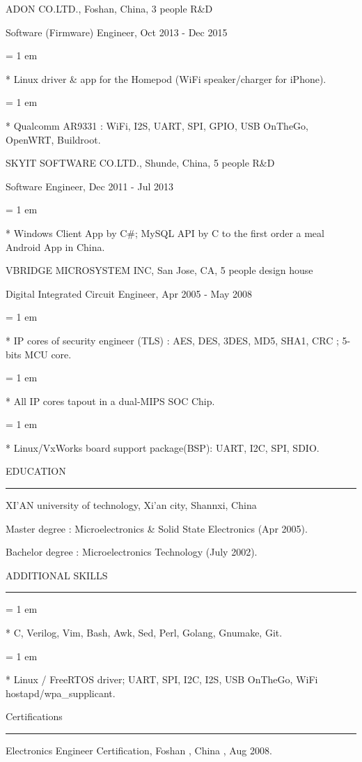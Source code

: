 { \medbreak } { \FFbg
ADON CO.LTD., Foshan, China, 3 people R\&D
}

{ \FFte
Software (Firmware) Engineer, Oct 2013 - Dec 2015
}
{ \parindent = 1 em \item{*}
 Linux driver \& app for the Homepod (WiFi speaker/charger for iPhone). 
}
{ \parindent = 1 em \item{*}
 Qualcomm AR9331 : WiFi, I2S, UART, SPI, GPIO, USB OnTheGo, OpenWRT, Buildroot.
 }

{ \medbreak } { \FFbg
SKYIT SOFTWARE CO.LTD., Shunde, China, 5 people R\&D
}

{ \FFte
Software Engineer, Dec 2011 - Jul 2013
}
{ \parindent = 1 em \item{*}
 Windows Client App by C\#; MySQL API by C to the first order a meal Android App in China.
 }

{ \medbreak } { \FFbg
VBRIDGE MICROSYSTEM INC, San Jose, CA, 5 people design house
}

{ \FFte
Digital Integrated Circuit Engineer, Apr 2005 - May 2008
}
{ \parindent = 1 em \item{*}
 IP cores of security engineer (TLS) :
 AES, DES, 3DES, MD5, SHA1, CRC ;
 5-bits MCU core.
 }
{ \parindent = 1 em \item{*}
All IP cores tapout in a dual-MIPS SOC Chip.
 }
{ \parindent = 1 em \item{*}
Linux/VxWorks board support package(BSP): UART, I2C, SPI, SDIO.
 }

{ \medbreak } { \FFbg
EDUCATION
}
{ \smallbreak } {\par\noindent\hrule} { \smallbreak }
XI'AN university of technology, Xi'an city, Shannxi, China

{ \FFte
Master degree : Microelectronics \& Solid State Electronics (Apr 2005).
}

{ \FFte
Bachelor degree : Microelectronics Technology (July 2002).
}

{ \medbreak } { \FFbg
ADDITIONAL SKILLS
}
{ \smallbreak } {\par\noindent\hrule} { \smallbreak }
{ \parindent = 1 em \item{*}
 C, Verilog, Vim, Bash, Awk, Sed, Perl, Golang, Gnumake, Git.
 }
{ \parindent = 1 em \item{*}
 Linux / FreeRTOS driver; UART, SPI, I2C, I2S, USB OnTheGo, WiFi hostapd/wpa\_supplicant.
 }

{ \medbreak } { \FFbg
Certifications
}
{ \smallbreak } {\par\noindent\hrule} { \smallbreak }
Electronics Engineer Certification, Foshan , China , Aug 2008.

